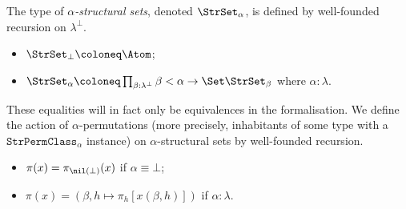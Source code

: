 \begin{definition}
  \label{def:StrSet}
  \leanok
  The type of \emph{\( \alpha \)-structural sets}, denoted \( \StrSet_\alpha \), is defined by well-founded recursion on \( \lambda^\bot \).
  \begin{itemize}
    \item \( \StrSet_\bot \coloneq \Atom \);
    \item \( \StrSet_\alpha \coloneq \prod_{\beta : \lambda^\bot} \beta < \alpha \to \Set \StrSet_\beta \) where \( \alpha : \lambda \).
  \end{itemize}
  These equalities will in fact only be equivalences in the formalisation.
  We define the action of \( \alpha \)-permutations (more precisely, inhabitants of some type with a \( \texttt{StrPermClass}_\alpha \) instance) on \( \alpha \)-structural sets by well-founded recursion.
  \begin{itemize}
    \item \( \pi(x) = \pi_{\nil(\bot)}(x) \) if \( \alpha \equiv \bot \);
    \item \( \pi(x) = (\beta, h \mapsto \pi_h[x(\beta, h)]) \) if \( \alpha : \lambda \).
  \end{itemize}
\end{definition}

